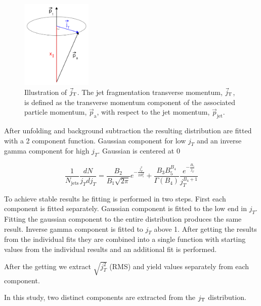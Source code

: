  
  \begin{figure}
    \begin{center}
      \includegraphics[width = 0.30\textwidth]{figures/jtwithrightangle}
    \end{center}
    \caption{Illustration of $\vec{j}_{\rm T}$. The jet fragmentation transverse momentum, $\vec{j}_{\rm T}$, is defined as the transverse momentum component of the associated particle momentum, $\vec{p}_{\mathrm{a}}$, with respect to the jet momentum, $\vec{p}_{\mathrm{jet}}$.}
    \label{fig:jtdefinition}
  \end{figure}


After unfolding and background subtraction the resulting distribution are fitted with a 2 component function. Gaussian component for low $j_T$ and an inverse gamma component for high $j_T$. Gaussian is centered at $0$

$$\frac{1}{N_{\mathrm{jets}}}\frac{dN}{j_T dj_T} = \frac{B_2}{B_1\sqrt{2\pi}}e^{-\frac{j_T^2}{2B_1^2}}+\frac{B_3B_5^{B_4}}{\Gamma\left(B_4\right)}\frac{e^{-\frac{B_5}{j_T}}}{j_T^{B_4+1}}$$

To achieve stable results he fitting is performed in two steps. First each component is fitted separately. Gaussian component is fitted to the low end in $j_T$. Fitting the gaussian component to the entire distribution produces the same result. Inverse gamma component is fitted to $j_T$ above 1. After getting the results from the individual fits they are combined into a single function with starting values from the individual results and an additional fit is performed.

After the getting we extract $\sqrt{j_T^2}$ (RMS) and yield values separately from each component.

In this study, two distinct components are extracted from the $j_{\rm T}$ distribution. 

